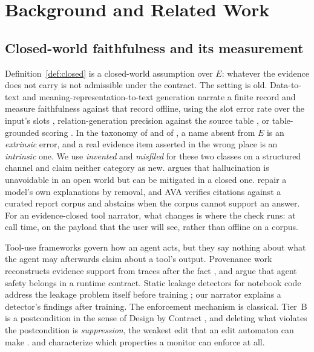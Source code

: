 \documentclass[smallextended,natbib]{svjour3}
\begin{document}
\section{Background and Related Work}\label{sec:related}

\subsection{Closed-world faithfulness and its measurement}

Definition~\ref{def:closed} is a closed-world assumption \citep{reiter1978closed}
over $E$: whatever the evidence does not carry is not admissible under the
contract. The setting is old. Data-to-text and
meaning-representation-to-text generation narrate a finite record and measure
faithfulness against that record offline, using the slot error rate over the
input's slots \citep{dusek2020e2e}, relation-generation precision against the
source table \citep{wiseman2017challenges}, or table-grounded
scoring \citep{dhingra2019parent}. In the taxonomy of \citet{ji} and of \citet{maynez2020faithfulness}, a
name absent from $E$ is an \emph{extrinsic} error, and a real evidence item
asserted in the wrong place is an \emph{intrinsic} one. We use
\emph{invented} and \emph{misfiled} for these two classes on a structured
channel and claim neither category as new. \citet{xu2025openworld} argues
that hallucination is unavoidable in an open world but can be mitigated in a
closed one. \citet{luo2026removal} repair a model's own
explanations by removal, and AVA \citep{karnatak2026ava} verifies citations
against a curated report corpus and abstains when the corpus cannot support an
answer. For an evidence-closed tool narrator, what changes is where the check
runs: at call time, on the payload that the user will see, rather than offline
on a corpus.

Tool-use frameworks \citep{react,toolformer,mcp} govern how an agent acts, but
they say nothing about what the agent may afterwards claim about a tool's
output. Provenance work reconstructs evidence support from traces after the
fact \citep{wang2026agenttraces}, and \citet{ng2026runtimecontract} argue that agent safety belongs in a runtime
contract. Static leakage detectors for notebook code address the leakage
problem itself before training \citep{yang2022leakage,truong2025leakagedetector};
our narrator explains a detector's findings after training. The enforcement
mechanism is classical. Tier~B is a postcondition in the sense of Design by
Contract \citep{meyer1992dbc}, and deleting what violates the postcondition is
\emph{suppression}, the weakest edit that an edit automaton can
make \citep{ligatti2005edit}. \citet{schneider2000enforceable} and
\citet{falcone2012verify} characterize which properties a
monitor can enforce at all.
\end{document}
